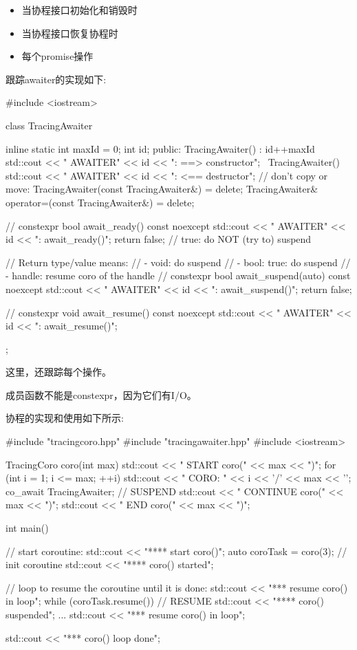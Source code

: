 \begin{itemize}
\item
当协程接口初始化和销毁时

\item
当协程接口恢复协程时

\item
每个promise操作
\end{itemize}

跟踪awaiter的实现如下:


\begin{cpp}
#include <iostream>

class TracingAwaiter {
	inline static int maxId = 0;
	int id;
	public:
	TracingAwaiter() : id{++maxId} {
		std::cout << " AWAITER" << id << ": ==> constructor\n";
	}
	~TracingAwaiter() {
		std::cout << " AWAITER" << id << ": <== destructor\n";
	}
	// don’t copy or move:
	TracingAwaiter(const TracingAwaiter&) = delete;
	TracingAwaiter& operator=(const TracingAwaiter&) = delete;

	// constexpr
	bool await_ready() const noexcept {
		std::cout << " AWAITER" << id << ": await_ready()\n";
		return false; // true: do NOT (try to) suspend
	}

	// Return type/value means:
	// - void: do suspend
	// - bool: true: do suspend
	// - handle: resume coro of the handle
	// constexpr
	bool await_suspend(auto) const noexcept {
		std::cout << " AWAITER" << id << ": await_suspend()\n";
		return false;
	}

	// constexpr
	void await_resume() const noexcept {
		std::cout << " AWAITER" << id << ": await_resume()\n";
	}
};
\end{cpp}

这里，还跟踪每个操作。

成员函数不能是constexpr，因为它们有I/O。

协程的实现和使用如下所示:


\begin{cpp}
#include "tracingcoro.hpp"
#include "tracingawaiter.hpp"
#include <iostream>

TracingCoro coro(int max)
{
	std::cout << " START coro(" << max << ")\n";
	for (int i = 1; i <= max; ++i) {
		std::cout << "  CORO: " << i << '/' << max << '\n';
		co_await TracingAwaiter{}; // SUSPEND
		std::cout << "   CONTINUE coro(" << max << ")\n";
	}
	std::cout << "  END coro(" << max << ")\n";
}

int main()
{
	// start coroutine:
	std::cout << "**** start coro()\n";
	auto coroTask = coro(3); // init coroutine
	std::cout << "**** coro() started\n";

	// loop to resume the coroutine until it is done:
	std::cout << "\n**** resume coro() in loop\n";
	while (coroTask.resume()) { // RESUME
		std::cout << "**** coro() suspended\n";
		...
		std::cout << "\n**** resume coro() in loop\n";
	}

	std::cout << "\n**** coro() loop done\n";
}
\end{cpp}

